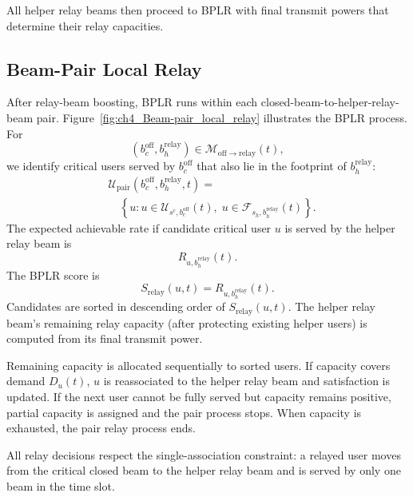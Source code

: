 All helper relay beams then proceed to BPLR with final transmit powers that determine their relay capacities.

\subsection{Beam-Pair Local Relay}

After relay-beam boosting, BPLR runs within each closed-beam-to-helper-relay-beam pair. Figure~\ref{fig:ch4_Beam-pair_local_relay} illustrates the BPLR process. For
\begin{equation*}
(b_c^{\mathrm{off}},b_h^{\mathrm{relay}})\in \mathcal{M}_{\mathrm{off}\to\mathrm{relay}}(t),
\end{equation*}
we identify critical users served by $b_c^{\mathrm{off}}$ that also lie in the footprint of $b_h^{\mathrm{relay}}$:
\begin{equation*}
\begin{split}
&\mathcal{U}_{\mathrm{pair}}(b_c^{\mathrm{off}},b_h^{\mathrm{relay}},t)= \\
&\quad
\left\{
u :
u\in\mathcal{U}_{s^{\mathrm{c}},b_c^{\mathrm{off}}}(t),\;
u\in\mathcal{F}_{s_h,b_h^{\mathrm{relay}}}(t)
\right\}.
\end{split}
\end{equation*}
The expected achievable rate if candidate critical user $u$ is served by the helper relay beam is
\begin{equation*}
R_{u,b_h^{\mathrm{relay}}}(t).
\end{equation*}
The BPLR score is
\begin{equation*}
S_{\mathrm{relay}}(u,t)=R_{u,b_h^{\mathrm{relay}}}(t).
\end{equation*}
Candidates are sorted in descending order of $S_{\mathrm{relay}}(u,t)$. The helper relay beam's remaining relay capacity (after protecting existing helper users) is computed from its final transmit power.

Remaining capacity is allocated sequentially to sorted users. If capacity covers demand $D_u(t)$, $u$ is reassociated to the helper relay beam and satisfaction is updated. If the next user cannot be fully served but capacity remains positive, partial capacity is assigned and the pair process stops. When capacity is exhausted, the pair relay process ends.

All relay decisions respect the single-association constraint: a relayed user moves from the critical closed beam to the helper relay beam and is served by only one beam in the time slot.

